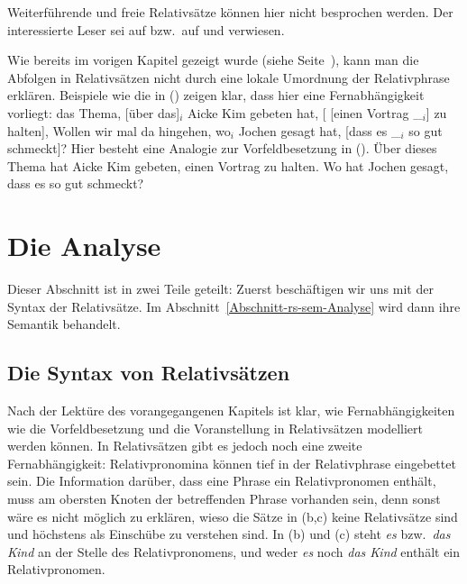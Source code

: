 \noindent
Weiterführende und freie Relativsätze können hier nicht besprochen werden. Der interessierte Leser
sei auf  bzw.\ auf  und  verwiesen.

Wie bereits im vorigen Kapitel gezeigt wurde (siehe Seite~\pageref{bsp-nla-rs}), 
kann man die Abfolgen in Relativsätzen nicht durch
eine lokale Umordnung der Relativphrase erklären. Beispiele wie die in () zeigen
klar, dass hier eine Fernabhängigkeit vorliegt:
\ea
das Thema, [über das]$_i$ Aicke Kim gebeten hat, [ [einen Vortrag \_$_i$] zu halten],
\z
\ea
Wollen wir mal da hingehen, wo$_i$ Jochen gesagt hat, [dass es \_$_i$ so gut schmeckt]?
\z
Hier besteht eine Analogie zur Vorfeldbesetzung in ().
\eal
\ex Über dieses Thema hat Aicke Kim gebeten, einen Vortrag zu halten.
\ex Wo hat Jochen gesagt, dass es so gut schmeckt?
\zl



\section{Die Analyse}
\label{sec-rs-anal}

Dieser Abschnitt ist in zwei Teile geteilt: Zuerst beschäftigen wir uns
mit der Syntax der Relativsätze. Im Abschnitt~\ref{Abschnitt-rs-sem-Analyse} wird dann ihre Semantik
behandelt.

\subsection{Die Syntax von Relativsätzen}
\label{sec-syntax-rs}
\label{lp-rs}%

Nach der Lektüre des vorangegangenen Kapitels ist klar, wie Fernabhängigkeiten wie \zb die
Vorfeldbesetzung und die Voranstellung in Relativsätzen modelliert werden können. In Relativsätzen gibt
es jedoch noch eine zweite Fernabhängigkeit: Relativpronomina können tief in der Relativphrase
eingebettet sein. Die Information darüber, dass eine Phrase ein Relativpronomen enthält, muss
am obersten Knoten der betreffenden Phrase vorhanden sein, denn sonst wäre es nicht möglich zu erklären,
wieso die Sätze in (b,c) keine Relativsätze sind und höchstens als Einschübe zu verstehen sind.
\eal
{}
\zl
In (b) und (c) steht \emph{es} bzw.\ \emph{das Kind} an der Stelle des
Relativpronomens, und weder \emph{es} noch \emph{das Kind} enthält ein Relativpronomen.

